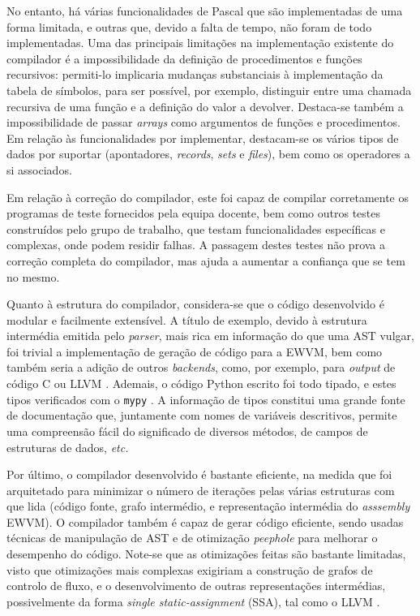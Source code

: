 \documentclass[12pt, a4paper]{article}
\begin{document}
No entanto, há várias funcionalidades de Pascal que são implementadas de uma forma limitada, e
outras que, devido a falta de tempo, não foram de todo implementadas. Uma das principais limitações
na implementação existente do compilador é a impossibilidade da definição de procedimentos e funções
recursivos: permiti-lo implicaria mudanças substanciais à implementação da tabela de símbolos, para
ser possível, por exemplo, distinguir entre uma chamada recursiva de uma função e a definição do
valor a devolver. Destaca-se também a impossibilidade de passar \emph{arrays} como argumentos de
funções e procedimentos. Em relação às funcionalidades por implementar, destacam-se os vários tipos
de dados por suportar (apontadores, \emph{records}, \emph{sets} e \emph{files}), bem como os
operadores a si associados.

Em relação à correção do compilador, este foi capaz de compilar corretamente os programas de teste
fornecidos pela equipa docente, bem como outros testes construídos pelo grupo de trabalho, que
testam funcionalidades específicas e complexas, onde podem residir falhas. A passagem destes testes
não prova a correção completa do compilador, mas ajuda a aumentar a confiança que se tem no mesmo.

Quanto à estrutura do compilador, considera-se que o código desenvolvido é modular e facilmente
extensível. A título de exemplo, devido à estrutura intermédia emitida pelo \emph{parser}, mais rica
em informação do que uma AST vulgar, foi trivial a implementação de geração de código para a EWVM,
bem como também seria a adição de outros \emph{backends}, como, por exemplo, para \emph{output} de
código C \cite{c} ou LLVM \cite{llvm}. Ademais, o código Python escrito foi todo tipado, e estes
tipos verificados com o \texttt{mypy} \cite{mypy}. A informação de tipos constitui uma grande fonte
de documentação que, juntamente com nomes de variáveis descritivos, permite uma compreensão fácil
do significado de diversos métodos, de campos de estruturas de dados, \emph{etc.}

Por último, o compilador desenvolvido é bastante eficiente, na medida que foi arquitetado para
minimizar o número de iterações pelas várias estruturas com que lida (código fonte, grafo
intermédio, e representação intermédia do \emph{asssembly} EWVM). O compilador também é capaz de
gerar código eficiente, sendo usadas técnicas de manipulação de AST e de otimização \emph{peephole}
para melhorar o desempenho do código. Note-se que as otimizações feitas são bastante limitadas,
visto que otimizações mais complexas exigiriam a construção de grafos de controlo de fluxo, e o
desenvolvimento de outras representações intermédias, possivelmente da forma
\emph{single static-assignment} (SSA), tal como o LLVM \cite{llvm}.
\end{document}
